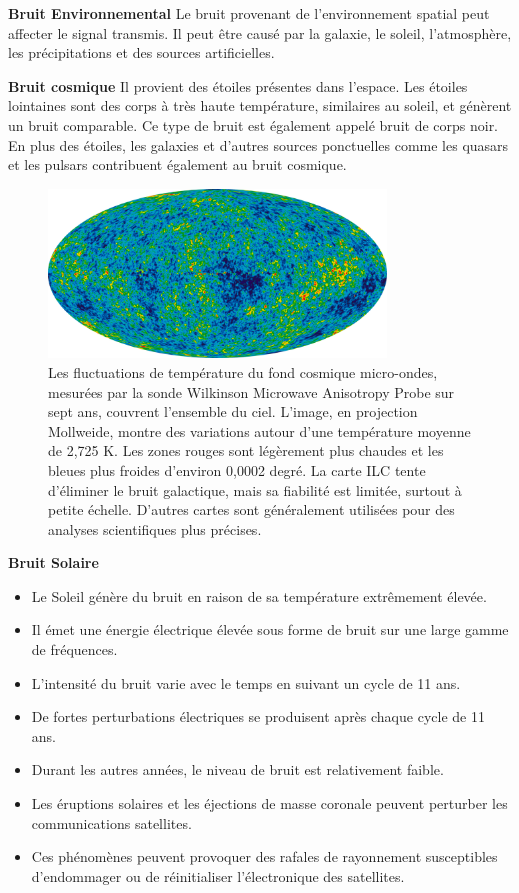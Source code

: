 \textbf{Bruit Environnemental}
Le bruit provenant de l’environnement spatial peut affecter le signal transmis. Il peut être causé par la galaxie, le soleil, l’atmosphère, les précipitations et des sources artificielles.

\textbf{Bruit cosmique} 
Il provient des étoiles présentes dans l’espace. Les étoiles lointaines sont des corps à très haute température, similaires au soleil, et génèrent un bruit comparable. Ce type de bruit est également appelé bruit de corps noir. En plus des étoiles, les galaxies et d’autres sources ponctuelles comme les quasars et les pulsars contribuent également au bruit cosmique.

\begin{figure}[H] %
    \centering
    \includegraphics[width=0.8\textwidth]{figures/6-62.png}
    
    \caption{Les fluctuations de température du fond cosmique micro-ondes, mesurées par la sonde Wilkinson Microwave Anisotropy Probe sur sept ans, couvrent l’ensemble du ciel. L’image, en projection Mollweide, montre des variations autour d’une température moyenne de 2,725 K. Les zones rouges sont légèrement plus chaudes et les bleues plus froides d’environ 0,0002 degré. La carte ILC tente d’éliminer le bruit galactique, mais sa fiabilité est limitée, surtout à petite échelle. D’autres cartes sont généralement utilisées pour des analyses scientifiques plus précises.}
    \label{fig:communication2}
\end{figure}

\textbf{Bruit Solaire}

\begin{itemize}
        \item Le Soleil génère du bruit en raison de sa température extrêmement élevée.
        \item Il émet une énergie électrique élevée sous forme de bruit sur une large gamme de fréquences.
        \item L'intensité du bruit varie avec le temps en suivant un cycle de 11 ans.
        \item De fortes perturbations électriques se produisent après chaque cycle de 11 ans.
        \item Durant les autres années, le niveau de bruit est relativement faible.
        \item Les éruptions solaires et les éjections de masse coronale peuvent perturber les communications satellites.
        \item Ces phénomènes peuvent provoquer des rafales de rayonnement susceptibles d’endommager ou de réinitialiser l’électronique des satellites. \end{itemize}

